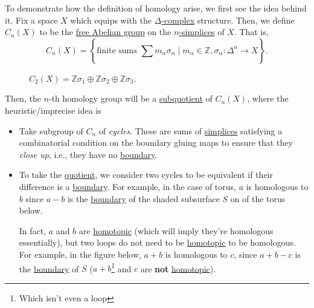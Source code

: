 To demonstrate how the definition of homology arise, we first see the idea behind it. Fix a space \(X\) which equips with the \hyperref[def:delta-complex]{\(\Delta\)-complex} structure. Then, we define \(C_{n} (X)\) to be the \hyperref[def:free-Abelian-group]{free Abelian group} on the \hyperref[def:standard-simplex]{\(n\)-simplices} of \(X\). That is,
\[
	C_{n} (X) = \left\{\text{finite sums } \sum\limits_{}^{} m_\alpha \sigma _\alpha \mid m_\alpha \in \mathbb{Z} , \sigma _\alpha \colon \Delta ^n\to X\right\}.
\]
\begin{figure}[H]
	\centering
	\caption{\(C_2(X) = \mathbb{Z} \sigma _1 \oplus \mathbb{Z} \sigma _2\oplus \mathbb{Z} \sigma _3\).}
	\label{fig:C2-lec21}
\end{figure}
Then, the \(n\)-th homology group will be a \hyperref[CW-complex-quotient]{subquotient} of \(C_{n} (X)\), where the heuristic/imprecise idea is
\begin{itemize}
	\item Take subgroup of \(C_{n}\) of \emph{cycles}. These are sums of \hyperref[def:standard-simplex]{simplices} satisfying a combinatorial condition on the boundary gluing maps to ensure that they \emph{close up}, i.e., they have no \hyperref[def:boundary]{boundary}.
	      \begin{figure}[H]
		      \centering
		      \label{fig:lec21-demo-of-homology-group}
	      \end{figure}
	\item To take the \hyperref[CW-complex-quotient]{quotient}, we consider two cycles to be equivalent if their difference is a \hyperref[def:boundary]{boundary}. For example, in the case of torus, \(a\) is homologous to \(b\) since \(a - b\) is the \hyperref[def:boundary]{boundary} of the shaded subsurface \(S\) on of the torus below.
	      \begin{figure}[H]
		      \centering
		      \label{fig:lec21-torus}
	      \end{figure}
	      In fact, \(a\) and \(b\) are \hyperref[def:homotopic]{homotopic} (which will imply they're homologous essentially), but two loops do not need to be \hyperref[def:homotopic]{homotopic} to be homologous. For example, in the figure below, \(a+b\) is homologous to \(c\), since \(a+b-c\) is the \hyperref[def:boundary]{boundary} of \(S\) (\(a+b\)\footnote{Which isn't even a loop} and \(c\) are \textbf{not} \hyperref[def:homotopic]{homotopic}).
	      \begin{figure}[H]
		      \centering
		      \label{fig:lec21-3-torus}
	      \end{figure}
\end{itemize}

